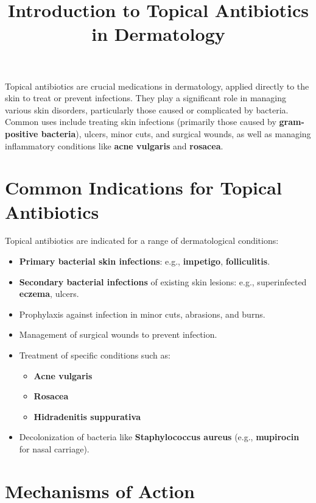 \documentclass{article}
\title{Introduction to Topical Antibiotics in Dermatology}
\begin{document}
\maketitle

Topical antibiotics are crucial medications in dermatology, applied directly to the skin to treat or prevent infections. They play a significant role in managing various skin disorders, particularly those caused or complicated by bacteria. Common uses include treating skin infections (primarily those caused by \textbf{gram-positive bacteria}), ulcers, minor cuts, and surgical wounds, as well as managing inflammatory conditions like \textbf{acne vulgaris} and \textbf{rosacea}.

\section*{Common Indications for Topical Antibiotics}

Topical antibiotics are indicated for a range of dermatological conditions:
\begin{itemize}
    \item \textbf{Primary bacterial skin infections}: e.g., \textbf{impetigo}, \textbf{folliculitis}.
    \item \textbf{Secondary bacterial infections} of existing skin lesions: e.g., superinfected \textbf{eczema}, ulcers.
    \item Prophylaxis against infection in minor cuts, abrasions, and burns.
    \item Management of surgical wounds to prevent infection.
    \item Treatment of specific conditions such as:
    \begin{itemize}
        \item \textbf{Acne vulgaris}
        \item \textbf{Rosacea}
        \item \textbf{Hidradenitis suppurativa}
    \end{itemize}
    \item Decolonization of bacteria like \textbf{Staphylococcus aureus} (e.g., \textbf{mupirocin} for nasal carriage).
\end{itemize}

\section*{Mechanisms of Action}
\end{document}

